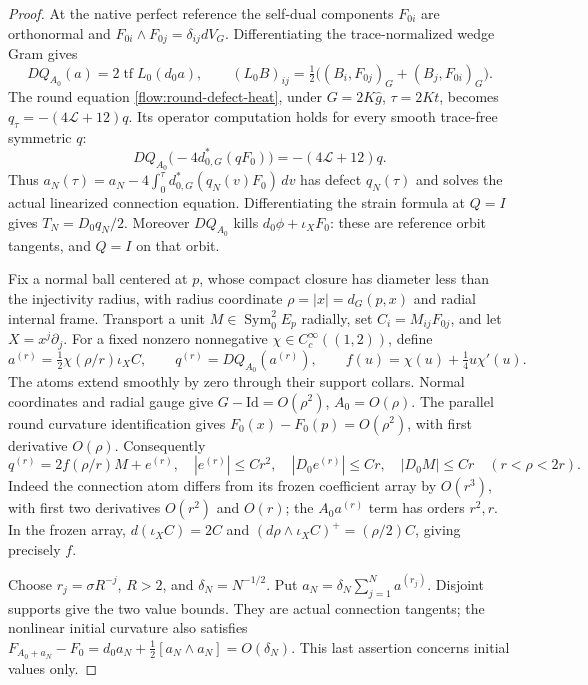 \documentclass[11pt]{article}
\numberwithin{equation}{section}
\theoremstyle{definition}
\theoremstyle{remark}
\begin{document}
\begin{proof}
At the native perfect reference the self-dual components
\(F_{0i}\) are orthonormal and
\(F_{0i}\wedge F_{0j}=\delta_{ij}dV_G\). Differentiating
the trace-normalized wedge Gram gives
\[
 DQ_{A_0}(a)=2\operatorname{tf}L_0(d_0a),\qquad
 (L_0B)_{ij}=\tfrac12\bigl((B_i,F_{0j})_G+(B_j,F_{0i})_G\bigr).
\]
The round equation \eqref{flow:round-defect-heat}, under
\(G=2K\widehat g\), \(\tau=2Kt\), becomes
\(q_\tau=-(4\mathcal L+12)q\). Its operator computation holds
for every smooth trace-free symmetric \(q\):
\[
 DQ_{A_0}\bigl(-4d_{0,G}^*(qF_0)\bigr)=-(4\mathcal L+12)q.
\]
Thus
\(a_N(\tau)=a_N-4\int_0^\tau d_{0,G}^*(q_N(v)F_0)\,dv\)
has defect \(q_N(\tau)\) and solves the actual linearized
connection equation. Differentiating the strain formula at
\(Q=I\) gives \(T_N=D_0q_N/2\).
Moreover \(DQ_{A_0}\) kills \(d_0\phi+\iota_XF_0\):
these are reference orbit tangents, and \(Q=I\) on that orbit.

Fix a normal ball centered at \(p\), whose compact closure
has diameter less than the injectivity radius, with radius coordinate
\(\rho=|x|=d_G(p,x)\) and radial internal frame. Transport a unit
\(M\in\operatorname{Sym}^2_0E_p\) radially, set
\(C_i=M_{ij}F_{0j}\), and let \(X=x^j\partial_j\).
For a fixed nonzero nonnegative
\(\chi\in C_c^\infty((1,2))\), define
\[
 a^{(r)}=\tfrac12\chi(\rho/r)\iota_XC,\qquad
 q^{(r)}=DQ_{A_0}(a^{(r)}),\qquad
 f(u)=\chi(u)+\tfrac14u\chi'(u).
\]
The atoms extend smoothly by zero through their support collars.
Normal coordinates and radial gauge give
\(G-\mathrm{Id}=O(\rho^2)\), \(A_0=O(\rho)\).
The parallel round curvature identification gives
\(F_0(x)-F_0(p)=O(\rho^2)\), with first derivative \(O(\rho)\).
Consequently
\[
 q^{(r)}=2f(\rho/r)M+e^{(r)},\quad
 |e^{(r)}|\le Cr^2,\quad |D_0e^{(r)}|\le Cr,\quad
 |D_0M|\le Cr
 \quad(r<\rho<2r).
\]
Indeed the connection atom differs from its frozen coefficient
array by \(O(r^3)\), with first two derivatives \(O(r^2)\)
and \(O(r)\); the \(A_0a^{(r)}\) term has orders \(r^2,r\).
In the frozen array,
\(d(\iota_X C)=2C\) and
\((d\rho\wedge\iota_X C)^+=(\rho/2)C\), giving precisely \(f\).

Choose \(r_j=\sigma R^{-j}\), \(R>2\), and
\(\delta_N=N^{-1/2}\). Put
\(a_N=\delta_N\sum_{j=1}^N a^{(r_j)}\).
Disjoint supports give the two value bounds.
They are actual connection tangents; the nonlinear initial
curvature also satisfies
\(F_{A_0+a_N}-F_0=d_0a_N+\tfrac12[a_N\wedge a_N]=O(\delta_N)\).
This last assertion concerns initial values only.


\end{proof}
\end{document}
